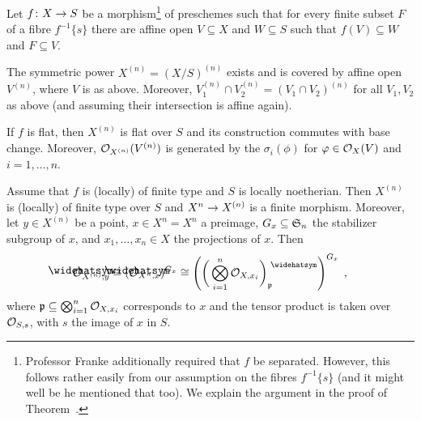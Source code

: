 \documentclass[a4paper,parskip=half,numbers=enddot, DIV=12]{scrreprt}
\begin{document}
\begin{prop}
	Let $f\colon X\morphism S$ be a morphism\footnote{Professor Franke additionally required that $f$ be separated. However, this follows rather easily from our assumption on the fibres $f^{-1}\{s\}$ (and it might well be he mentioned that too). We explain the argument in the proof of Theorem~.} of preschemes such that for every finite subset $F$ of a fibre $f^{-1}\{s\}$ there are affine open $V\subseteq X$ and $W\subseteq S$ such that $f(V)\subseteq W$ and $F\subseteq V$.
	\begin{alphanumerate}
		\item The symmetric power $X^{(n)}=(X/S)^{(n)}$ exists and is covered by affine open $V^{(n)}$, where $V$ is as above. Moreover, $V_1^{(n)}\cap V_2^{(n)}=(V_1\cap V_2)^{(n)}$ for all $V_1,V_2$ as above (and assuming their intersection is affine again).
		\item If $f$ is flat, then $X^{(n)}$ is flat over $S$ and its construction commutes with base change. Moreover, $\mathcal{O}_{X^{(n)}}(V^{(n)})$ is generated by the $\sigma_i(\phi)$ for $\varphi\in\mathcal{O}_X(V)$ and $i=1,\ldots,n$.
		\item Assume that $f$ is (locally) of finite type and $S$ is locally noetherian. Then $X^{(n)}$ is (locally) of finite type over $S$ and $X^n\morphism X^{(n)}$ is a finite morphism. Moreover, let $y\in X^{(n)}$ be a point, $x\in X^n=X^n$ a preimage, $G_x\subseteq \mathfrak{S}_n$ the stabilizer subgroup of $x$, and $x_1,\ldots,x_n\in X$ the projections of $x$. Then
		\begin{align*}
			\roof{\Oo}_{X^{(n)},y}\cong (\roof{\Oo}_{X^n,x})^{G_x}\cong \left(\bigg(\bigotimes_{i=1}^n\Oo_{X,x_i}\bigg)_\pp^\complete\right)^{G_x}\;,
		\end{align*}
		where $\mathfrak{p}\subseteq \bigotimes_{i=1}^n\mathcal{O}_{X,x_i}$ corresponds to $x$ and the tensor product is taken over $\mathcal{O}_{S,s}$, with $s$ the image of $x$ in $S$.
	\end{alphanumerate}
\end{prop}
\end{document}
